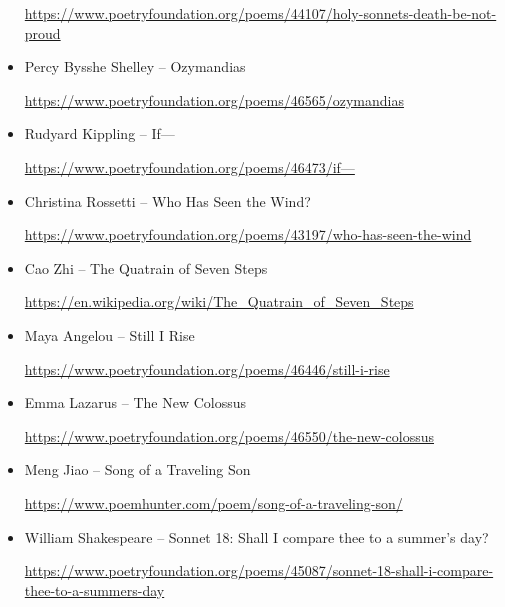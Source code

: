 \documentclass[12pt, openany, letterpaper]{memoir}
\begin{document}
\begin{itemize}
	\hyperref[https://www.poetryfoundation.org/poems/44107/holy-sonnets-death-be-not-proud]{https://www.poetryfoundation.org/poems/44107/holy-sonnets-death-be-not-proud}
	
	\item Percy Bysshe Shelley -- Ozymandias
	
	\hyperref[https://www.poetryfoundation.org/poems/46565/ozymandias]{https://www.poetryfoundation.org/poems/46565/ozymandias}
	
	\item Rudyard Kippling -- If---
	
	\hyperref[https://www.poetryfoundation.org/poems/46473/if---]{https://www.poetryfoundation.org/poems/46473/if---}
	
	\item Christina Rossetti -- Who Has Seen the Wind?
	
	\hyperref[https://www.poetryfoundation.org/poems/43197/who-has-seen-the-wind]{https://www.poetryfoundation.org/poems/43197/who-has-seen-the-wind}
	
	\item Cao Zhi -- The Quatrain of Seven Steps
	
	\hyperref[https://en.wikipedia.org/wiki/The_Quatrain_of_Seven_Steps]{https://en.wikipedia.org/wiki/The\_Quatrain\_of\_Seven\_Steps}
		
	\item Maya Angelou -- Still I Rise
	
	\hyperref[https://www.poetryfoundation.org/poems/46446/still-i-rise]{https://www.poetryfoundation.org/poems/46446/still-i-rise}
	
	\item Emma Lazarus -- The New Colossus
	
	\hyperref[https://www.poetryfoundation.org/poems/46550/the-new-colossus]{https://www.poetryfoundation.org/poems/46550/the-new-colossus}
	
	\item Meng Jiao -- Song of a Traveling Son
	
	\hyperref[https://www.poemhunter.com/poem/song-of-a-traveling-son/]{https://www.poemhunter.com/poem/song-of-a-traveling-son/}
	
	\item William Shakespeare -- Sonnet 18: Shall I compare thee to a summer’s day?
	
	\hyperref[https://www.poetryfoundation.org/poems/45087/sonnet-18-shall-i-compare-thee-to-a-summers-day]{https://www.poetryfoundation.org/poems/45087/sonnet-18-shall-i-compare-thee-to-a-summers-day}
	

\end{itemize}
\end{document}
